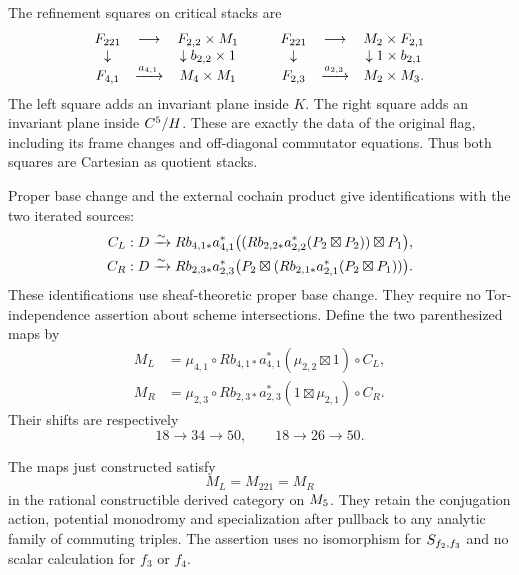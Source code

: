 The refinement squares on critical stacks are
\[
\begin{array}{ccc}
 F_{221}&\longrightarrow&F_{2,2}\times M_1\\
 \downarrow&&\downarrow b_{2,2}\times1\\
 F_{4,1}&\xrightarrow{a_{4,1}}&M_4\times M_1
\end{array}
 \qquad
\begin{array}{ccc}
 F_{221}&\longrightarrow&M_2\times F_{2,1}\\
 \downarrow&&\downarrow1\times b_{2,1}\\
 F_{2,3}&\xrightarrow{a_{2,3}}&M_2\times M_3.
\end{array}
\]
The left square adds an invariant plane inside $K$.
The right square adds an invariant plane inside $C^5/H$.
These are exactly the data of the original flag, including its
frame changes and off-diagonal commutator equations. Thus both
squares are Cartesian as quotient stacks.

Proper base change and the external cochain product give
identifications with the two iterated sources:
\[
\begin{split}
 C_L:D&\xrightarrow{\sim}
 Rb_{4,1*}a_{4,1}^*
  \bigl((Rb_{2,2*}a_{2,2}^*(P_2\boxtimes P_2))
                                      \boxtimes P_1\bigr),\\
 C_R:D&\xrightarrow{\sim}
 Rb_{2,3*}a_{2,3}^*
  \bigl(P_2\boxtimes
       (Rb_{2,1*}a_{2,1}^*(P_2\boxtimes P_1))\bigr).
\end{split}
\]
These identifications use sheaf-theoretic proper base change. They
require no Tor-independence assertion about scheme intersections.
Define the two parenthesized maps by
\[
\begin{split}
 M_L&=\mu_{4,1}\circ
 Rb_{4,1*}a_{4,1}^*(\mu_{2,2}\boxtimes1)\circ C_L,\\
 M_R&=\mu_{2,3}\circ
 Rb_{2,3*}a_{2,3}^*(1\boxtimes\mu_{2,1})\circ C_R.
\end{split}
\]
Their shifts are respectively
\[
        18\longrightarrow34\longrightarrow50,
        \qquad18\longrightarrow26\longrightarrow50.
\]

\begin{theorem}
\label{fl221:thm:assoc}
The maps just constructed satisfy
\[
                         M_L=M_{221}=M_R
\]
in the rational constructible derived category on $M_5$.
They retain the conjugation action, potential monodromy and
specialization after pullback to any analytic family of commuting
triples. The assertion uses no isomorphism for
$S_{f_2,f_3}$ and no scalar calculation for $f_3$ or $f_4$.
\end{theorem}

